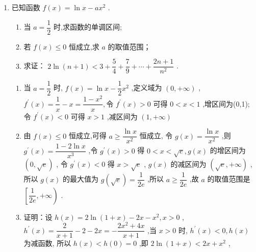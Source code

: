 \begin{enumerate}
\begin{enumerate}
\begin{jieda}
\begin{enumerate}
                又 $h\left( 1\right)  = a - 1 \leq  0$，故 $\ln x + a - 1 - \left( {x - 1}\right) {{e}}^{x - a} \leq  0$ ,结论得证.
            \end{enumerate}
        \end{jieda}
        \item 已知函数 $f\left( x\right)  = \ln x - a{x}^{2}$ .
        \begin{enumerate}
            \item 当 $a = \dfrac{1}{2}$ 时,求函数的单调区间;
            \item 若 $f\left( x\right)  \leq  0$ 恒成立,求 $a$ 的取值范围；
            \item 求证： $2\ln \left( {n + 1}\right)  < 3 + \dfrac{5}{4} + \dfrac{7}{9} + \cdots  + \dfrac{{2n} + 1}{{n}^{2}}$ .
        \end{enumerate}
        \begin{jieda}
            \begin{enumerate}
                \item 当 $a = \dfrac{1}{2}$ 时, $f\left( x\right)  = \ln x - \dfrac{1}{2}{x}^{2}$ ,定义域为 $\left( {0, + \infty }\right)$ ,${f}^{\prime }\left( x\right)  = \dfrac{1}{x} - x = \dfrac{1 - {x}^{2}}{x},$令 ${f}^{\prime }\left( x\right)  > 0$ 可得 $0 < x < 1$ ,增区间为(0,1); 令 ${f}^{\prime }\left( x\right)  < 0$ 可得 $x > 1$ ,减区间为 $\left( {1, + \infty }\right)$ 
                \item 由 $f\left( x\right)  \leq  0$ 恒成立,可得 $a \geq  \dfrac{\ln x}{{x}^{2}}$ 恒成立,
                令 $g\left( x\right)  = \dfrac{\ln x}{{x}^{2}}$ ,则 ${g}^{\prime }\left( x\right)  = \dfrac{1 - 2\ln x}{{x}^{3}}$ ,令 ${g}^{\prime }\left( x\right)  > 0$ 得 $0 < x < \sqrt{{e}},g\left( x\right)$ 的增区间为 $\left( {0,\sqrt{{e}}}\right)$ ,
                令 ${g}^{\prime }\left( x\right)  < 0$ 得 $x > \sqrt{{e}}$ , $g\left( x\right)$ 的减区间为 $\left( {\sqrt{{e}}, + \infty }\right)$ ,所以 $g\left( x\right)$ 的最大值为 $g\left( \sqrt{{e}}\right)  = \dfrac{1}{2{e}}$ ,所以 $a \geq  \dfrac{1}{2{e}}$ ,故 $a$
                的取值范围是 $\left\lbrack  {\dfrac{1}{2{e}}, + \infty }\right)$ .
                \item 证明：设 $h\left( x\right)  = 2\ln \left( {1 + x}\right)  - {2x} - {x}^{2},x > 0$ ,
                ${h}^{\prime }\left( x\right)  = \dfrac{2}{x + 1} - 2 - {2x} =  - \dfrac{2{x}^{2} + {4x}}{x + 1}$ ,当 $x > 0$ 时, ${h}^{\prime }\left( x\right)  < 0,h\left( x\right)$ 为减函数,
                所以 $h\left( x\right)  < h\left( 0\right)  = 0$ ,即 $2\ln \left( {1 + x}\right)  < {2x} + {x}^{2}$ ,

\end{enumerate}
\end{jieda}
\end{enumerate}
\end{enumerate}
